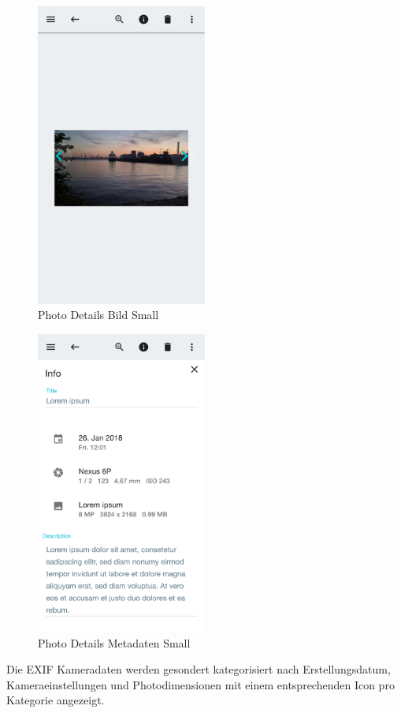 \begin{figure}[htp]     %
\centering
\includegraphics[width=0.5\textwidth]{images/details_small} 
\caption{Photo Details Bild Small}\label{fig:details_small}
\end{figure}

\begin{figure}[htp]     %
\centering
\includegraphics[width=0.5\textwidth]{images/form_small} 
\caption{Photo Details Metadaten Small}\label{fig:form_small}
\end{figure}

Die EXIF Kameradaten werden gesondert kategorisiert nach Erstellungsdatum, Kameraeinstellungen und Photodimensionen mit einem entsprechenden Icon pro Kategorie angezeigt.